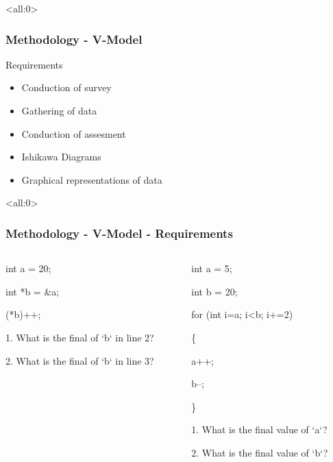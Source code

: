 \documentclass{beamer}
\begin{document}
\begin{frame}<all:0>
	\frametitle{Methodology - V-Model}
	\begin{block}{Requirements}
		\begin{itemize}
			\item<1-> Conduction of survey
			\item<2-> Gathering of data
			\item<3-> Conduction of assesment
		\end{itemize}

		\begin{itemize}
			\item<4-> Ishikawa Diagrams
			\item<5-> Graphical representations of data
		\end{itemize}
	\end{block}
\end{frame}

\begin{frame}<all:0>
	\frametitle{Methodology - V-Model - Requirements}

	\begin{columns}
		\begin{column}{.5\linewidth}
			\begin{semiverbatim}
				int a = 20;

				int *b = \&a;

				(*b)++;

				1. What is the final of `b` in line 2?

				2. What is the final of `b` in line 3?
			\end{semiverbatim}
		\end{column}

		\begin{column}{.5\linewidth}
			\begin{semiverbatim}
				int a = 5;

				int b = 20;

				for (int i=a; i<b; i+=2)

				\{

						a++;

						b--;

				\}

				1. What is the final value of `a`?

				2. What is the final value of `b`?
			\end{semiverbatim}
		\end{column}
	\end{columns}
\end{frame}
\end{document}
